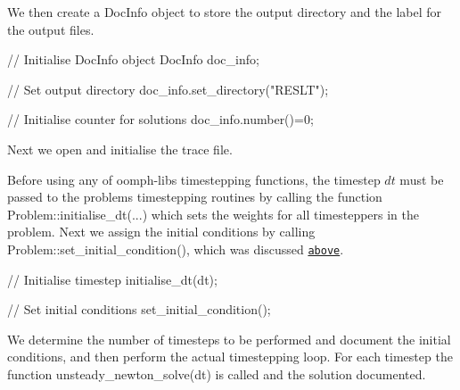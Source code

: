 We then create a {\ttfamily Doc\+Info} object to store the output directory and the label for the output files.


\begin{DoxyCodeInclude}
 \textcolor{comment}{// Initialise DocInfo object}
 DocInfo doc\_info;

 \textcolor{comment}{// Set output directory}
 doc\_info.set\_directory(\textcolor{stringliteral}{"RESLT"});

 \textcolor{comment}{// Initialise counter for solutions}
 doc\_info.number()=0;

\end{DoxyCodeInclude}


Next we open and initialise the trace file.




Before using any of {\ttfamily oomph-\/lib\textquotesingle{}s} timestepping functions, the timestep $ dt $ must be passed to the problem\textquotesingle{}s timestepping routines by calling the function {\ttfamily Problem\+::initialise\+\_\+dt}(...) which sets the weights for all timesteppers in the problem. Next we assign the initial conditions by calling {\ttfamily Problem\+::set\+\_\+initial\+\_\+condition()}, which was discussed \href{#set_initial_condition}{\tt above}.


\begin{DoxyCodeInclude}
 \textcolor{comment}{// Initialise timestep}
 initialise\_dt(dt);

 \textcolor{comment}{// Set initial conditions}
 set\_initial\_condition();

\end{DoxyCodeInclude}


We determine the number of timesteps to be performed and document the initial conditions, and then perform the actual timestepping loop. For each timestep the function {\ttfamily unsteady\+\_\+newton\+\_\+solve(dt)} is called and the solution documented.


